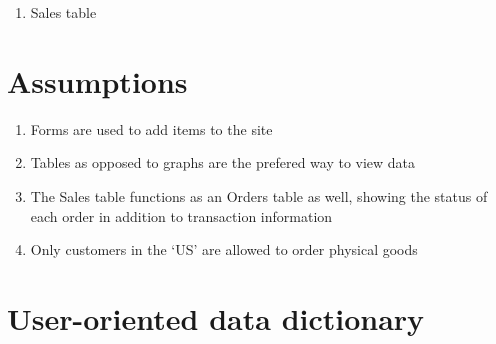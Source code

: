 \documentclass[11pt, a4paper]{report}
\begin{document}
\begin{enumerate}
\item Sales table
 
\end{enumerate}

\section{Assumptions}
\begin{enumerate}
\item Forms are used to add items to the site
\item Tables as opposed to graphs are the prefered way to view data
\item The Sales table functions as an Orders table as well, showing the status of each order in addition to transaction information
\item Only customers in the ‘US’ are allowed to order physical goods
\end{enumerate}

\section{User-oriented data dictionary}
\end{document}
